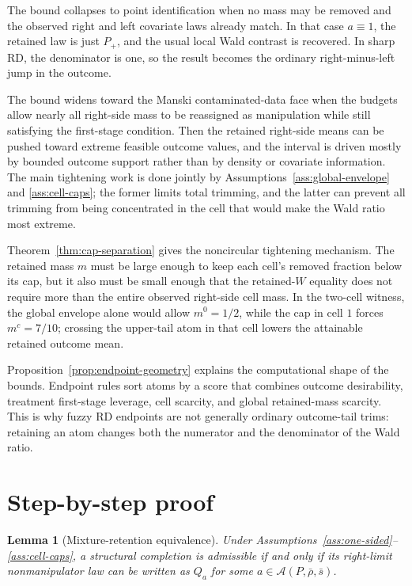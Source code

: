 \documentclass[11pt]{article}
\theoremstyle{definition}
\theoremstyle{plain}
\newtheorem{lemma}{Lemma}
\theoremstyle{remark}
\begin{document}
The bound collapses to point identification when no mass may be removed and the observed
right and left covariate laws already match.  In that case \(a\equiv1\), the retained law
is just \(P_+\), and the usual local Wald contrast is recovered.  In sharp RD, the
denominator is one, so the result becomes the ordinary right-minus-left jump in the outcome.

The bound widens toward the Manski contaminated-data face when the budgets allow nearly all
right-side mass to be reassigned as manipulation while still satisfying the first-stage
condition.  Then the retained right-side means can be pushed toward extreme feasible
outcome values, and the interval is driven mostly by bounded outcome support rather than
by density or covariate information.  The main tightening work is done jointly by
Assumptions~\ref{ass:global-envelope} and \ref{ass:cell-caps}; the former limits total
trimming, and the latter can prevent all trimming from being concentrated in the cell that
would make the Wald ratio most extreme.

Theorem~\ref{thm:cap-separation} gives the noncircular tightening mechanism.  The retained
mass \(m\) must be large enough to keep each cell's removed fraction below its cap, but it
also must be small enough that the retained-\(W\) equality does not require more than the
entire observed right-side cell mass.  In the two-cell witness, the global envelope alone
would allow \(m^0=1/2\), while the cap in cell \(1\) forces \(m^c=7/10\); crossing the
upper-tail atom in that cell lowers the attainable retained outcome mean.

Proposition~\ref{prop:endpoint-geometry} explains the computational shape of the bounds.
Endpoint rules sort atoms by a score that combines outcome desirability, treatment
first-stage leverage, cell scarcity, and global retained-mass scarcity.  This is why fuzzy
RD endpoints are not generally ordinary outcome-tail trims: retaining an atom changes both
the numerator and the denominator of the Wald ratio.

\section{Step-by-step proof}
\begin{lemma}[Mixture-retention equivalence]\label{lem:mixture-retention}
Under Assumptions~\ref{ass:one-sided}--\ref{ass:cell-caps}, a structural completion is
admissible if and only if its right-limit nonmanipulator law can be written as \(Q_a\) for
some \(a\in\mathcal A(P,\bar\rho,\bar s)\).
\end{lemma}
\end{document}
